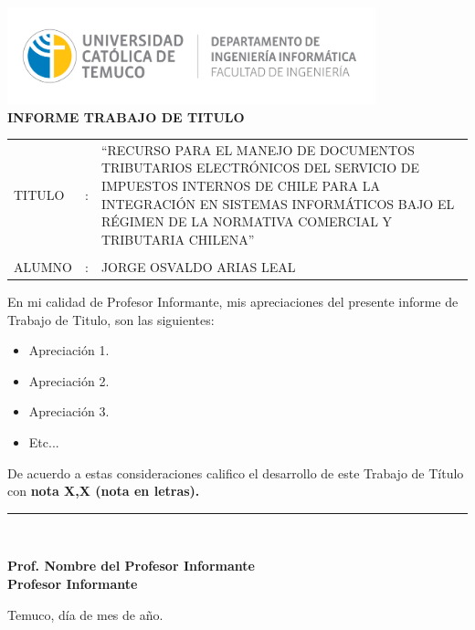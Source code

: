 \begin{center}
\vspace*{-9\baselineskip}
\hspace*{-0.1\textwidth}
\includegraphics[width=0.8\textwidth]{images/Logo_depto_ing_informatica.png}\nonumber\\
\textbf{INFORME  TRABAJO  DE TITULO}
\par\end{center}

\newcommand{\SubItem}[1]{
    {\setlength\itemindent{15pt} \item[-] #1}
}
\vspace{0.8cm}

\begin{tabular}{>{\raggedright}p{}>{\raggedright}p{}>{\raggedright}p{}}
TITULO & : & ``RECURSO PARA EL MANEJO DE DOCUMENTOS TRIBUTARIOS ELECTRÓNICOS DEL SERVICIO DE IMPUESTOS INTERNOS DE CHILE PARA LA INTEGRACIÓN EN SISTEMAS INFORMÁTICOS BAJO EL RÉGIMEN DE LA NORMATIVA COMERCIAL Y TRIBUTARIA CHILENA''\tabularnewline
 &  & \tabularnewline
ALUMNO & : & JORGE OSVALDO ARIAS LEAL\tabularnewline
\end{tabular}

\vspace{1cm}

En mi calidad de Profesor Informante, mis apreciaciones del presente informe de Trabajo de Titulo, son las siguientes:
\begin{itemize}
    \item Apreciación 1.
    \item Apreciación 2. 
    \item Apreciación 3.
    \item Etc...
\end{itemize}

De acuerdo a estas consideraciones califico el desarrollo de este Trabajo de Título con \textbf{nota X,X  (nota en letras).}

\vspace{1cm}

\begin{flushright}
\rule{65mm}{0.2mm}\\
\end{flushright} 
\vspace*{-0.1in}  
\hspace*{2.8in} \textbf{Prof. Nombre del Profesor Informante} \\ \hspace*{3.2in} \textbf{Profesor Informante}

\vspace{1cm}

Temuco, día de mes de año.
